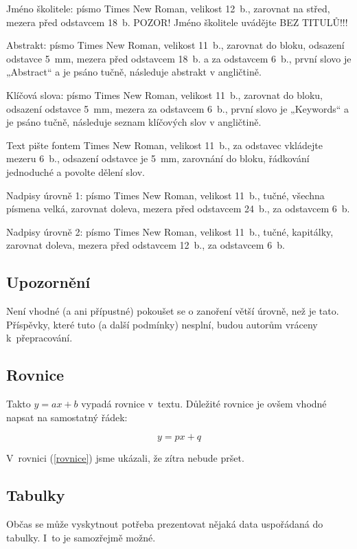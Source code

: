 \documentclass{eeict}
\begin{document}
Jméno školitele: písmo Times New Roman, velikost 12~b., zarovnat na střed, 
mezera před odstavcem 18~b. POZOR! Jméno školitele uvádějte BEZ TITULŮ!!!

Abstrakt: písmo Times New Roman, velikost 11~b., zarovnat do bloku, odsazení 
odstavce 5~mm,  mezera před odstavcem 18~b. a za odstavcem 6~b., první slovo je 
„Abstract“ a je psáno tučně, následuje abstrakt v angličtině.

Klíčová slova: písmo Times New Roman, velikost 11~b., zarovnat do bloku, 
odsazení odstavce 5~mm, mezera za odstavcem 6~b., první slovo je „Keywords“ a je
psáno tučně, následuje seznam klíčových slov v angličtině.

Text pište fontem Times New Roman, velikost 11~b., za odstavec vkládejte 
mezeru 6~b., odsazení odstavce je 5~mm, zarovnání do bloku, řádkování jednoduché
a povolte dělení slov.

Nadpisy úrovně 1: písmo Times New Roman, velikost 11~b., tučné, všechna písmena
velká, zarovnat doleva, mezera před odstavcem 24~b., za odstavcem 6~b.

Nadpisy úrovně 2: písmo Times New Roman, velikost 11~b., tučné, kapitálky, 
zarovnat doleva, mezera před odstavcem 12~b., za odstavcem 6~b.

\subsection{Upozornění}

Není vhodné (a ani přípustné) pokoušet se o zanoření větší úrovně, než je
tato. Příspěvky, které tuto (a další podmínky) nesplní, budou autorům
vráceny k~přepracování.

\subsection{Rovnice}
%
Takto $y=ax+b$ vypadá rovnice v~textu. Důležité rovnice je ovšem vhodné
napsat na samostatný řádek:

\begin{equation} \label{rovnice}
 y = px + q
\end{equation}

V~rovnici (\ref{rovnice}) jsme ukázali, že zítra nebude pršet.

\subsection{Tabulky}
Občas se může vyskytnout potřeba prezentovat nějaká data uspořádaná
do tabulky. I~to je samozřejmě možné.
\end{document}
